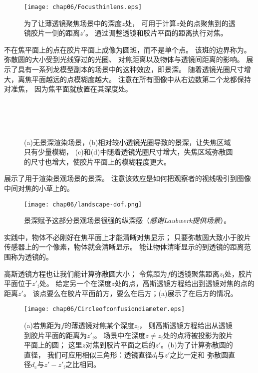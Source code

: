 \begin{figure}[htbp]
    \centering\texttt{[image: chap06/Focusthinlens.eps]}
    \caption{为了让薄透镜聚焦场景中的深度$z$处，
        可用于计算$z$处的点聚焦到的透镜胶片一侧的距离$z'$。
        通过调整透镜和胶片平面的距离执行对焦。}
    \label{fig:6.7}
\end{figure}

不在焦平面上的点在胶片平面上成像为圆斑，而不是单个点。
该斑的边界称为。
弥散圆的大小受到光线穿过的光圈、
对焦距离以及物体与透镜间距离的影响。
展示了具有一系列龙模型副本的场景中的这种效应，即景深。
随着透镜光圈尺寸增大，离焦平面越远的点模糊度越大。
注意在所有图像中从右边数第二个龙都保持对准焦，
因为焦平面就放置在其深度处。
\begin{figure}[htbp]
    \centering
    \\
    \\
    \\
    \caption{(a)无景深渲染场景，(b)相对较小透镜光圈导致的景深，让失焦区域只有少量模糊，
        (c)和(d)中随着透镜光圈尺寸增大，失焦区域弥散圆的尺寸也增大，使胶片平面上的模糊程度更大。}
    \label{fig:6.8}
\end{figure}

展示了用于渲染景观场景的景深。
注意该效应是如何把观察者的视线吸引到图像中间对焦的小草上的。
\begin{figure}[htbp]
    \centering\texttt{[image: chap06/landscape-dof.png]}
    \caption{景深赋予这部分景观场景很强的纵深感（{\itshape 感谢Laubwerk提供场景}）。}
    \label{fig:6.9}
\end{figure}

实践中，物体不必刚好在焦平面上才能清晰对焦显示；
只要弥散圆大致小于胶片传感器上的一个像素，物体就会清晰显示。
能让物体清晰显示的到透镜的距离范围称为透镜的。

高斯透镜方程也让我们能计算弥散圆大小；
令焦距为$f$的透镜聚焦距离$z_{\mathrm{f}}$处，胶片平面位于$z'_{\mathrm{f}}$处。
给定另一个在深度$z$处的点，高斯透镜方程给出到透镜对焦的点的距离$z'$。
该点要么在胶片平面前方，要么在后方；(a)展示了在后方的情况。
\begin{figure}[htbp]
    \centering\texttt{[image: chap06/Circleofconfusiondiameter.eps]}
    \caption{(a)若焦距为$f$的薄透镜对焦某个深度$z_{\mathrm{f}}$，
    则高斯透镜方程给出从透镜到胶片平面的距离为$z'_{\mathrm{f}}$。
    场景中在深度$z\neq z_{\mathrm{f}}$处的点将被投影为胶片平面上的圆；
    这里$z$对焦到胶片平面之后的$z'$。(b)为了计算弥散圆的直径，
    我们可应用相似三角形：透镜直径$d_{\mathrm{l}}$与$z'$之比一定和
    弥散圆直径$d_{\mathrm{c}}$与$z'-z'_{\mathrm{f}}$之比相同。}
    \label{fig:6.10}
\end{figure}

